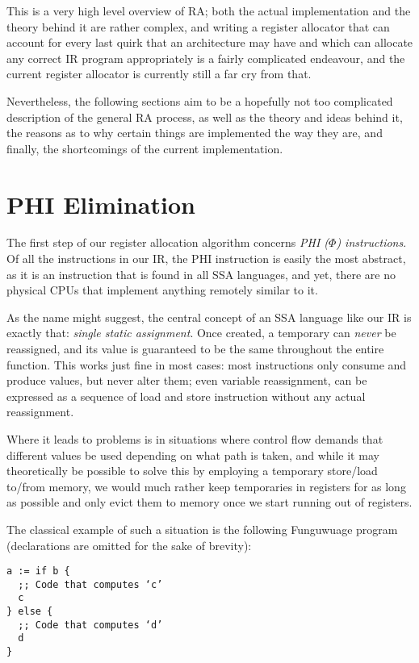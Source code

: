 \documentclass[12pt]{report}
\newcommand{\langname}{Funguwuage}
\begin{document}
This is a very high level overview of RA; both the actual implementation and the theory behind it are rather complex, and writing a register
allocator that can account for every last quirk that an architecture may have and which can allocate any correct IR program appropriately
is a fairly complicated endeavour, and the current register allocator is currently still a far cry from that.

Nevertheless, the following sections aim to be a hopefully not too complicated description of the general RA process, as well as the theory
and ideas behind it, the reasons as to why certain things are implemented the way they are, and finally, the shortcomings of the current 
implementation.

\section{PHI Elimination}
The first step of our register allocation algorithm concerns \textit{PHI ($\Phi$) instructions}. Of all the instructions in our IR, the PHI
instruction is easily the most abstract, as it is an instruction that is found in all SSA languages, and yet, there are no physical CPUs
that implement anything remotely similar to it.

As the name might suggest, the central concept of an SSA language like our IR is exactly that: \textit{single static assignment}. Once
created, a temporary can \textit{never} be reassigned, and its value is guaranteed to be the same throughout the entire function. This
works just fine in most cases: most instructions only consume and produce values, but never alter them; even variable reassignment,
can be expressed as a sequence of load and store instruction without any actual reassignment. 

Where it leads to problems is in situations where control flow demands that different values be used depending on what path is taken, 
and while it may theoretically be possible to solve this by employing a temporary store/load to/from memory, we would much rather keep
temporaries in registers for as long as possible and only evict them to memory once we start running out of registers.

The classical example of such a situation is the following \langname{} program (declarations are omitted for the sake of brevity):
\begin{Verbatim}
a := if b { 
  ;; Code that computes ‘c’
  c
} else {
  ;; Code that computes ‘d’
  d
}
\end{Verbatim}
\end{document}

